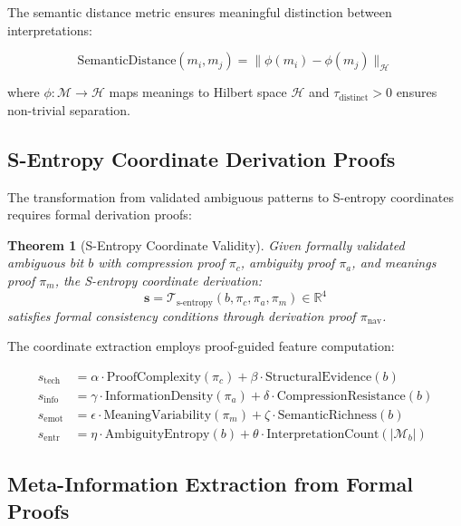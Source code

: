 \documentclass[11pt,a4paper]{article}
\newtheorem{theorem}{Theorem}[section]
\begin{document}
The semantic distance metric ensures meaningful distinction between interpretations:

\begin{equation}
\text{SemanticDistance}(m_i, m_j) = \|\phi(m_i) - \phi(m_j)\|_{\mathcal{H}}
\label{eq:semantic-distance}
\end{equation}

where $\phi: \mathcal{M} \to \mathcal{H}$ maps meanings to Hilbert space $\mathcal{H}$ and $\tau_{\text{distinct}} > 0$ ensures non-trivial separation.

\subsection{S-Entropy Coordinate Derivation Proofs}

The transformation from validated ambiguous patterns to S-entropy coordinates requires formal derivation proofs:

\begin{theorem}[S-Entropy Coordinate Validity]
Given formally validated ambiguous bit $b$ with compression proof $\pi_c$, ambiguity proof $\pi_a$, and meanings proof $\pi_m$, the S-entropy coordinate derivation:
\begin{equation}
\mathbf{s} = \mathcal{T}_{\text{s-entropy}}(b, \pi_c, \pi_a, \pi_m) \in \mathbb{R}^4
\label{eq:s-entropy-derivation}
\end{equation}
satisfies formal consistency conditions through derivation proof $\pi_{\text{nav}}$.
\end{theorem}

The coordinate extraction employs proof-guided feature computation:

\begin{align}
s_{\text{tech}} &= \alpha \cdot \text{ProofComplexity}(\pi_c) + \beta \cdot \text{StructuralEvidence}(b) \label{eq:tech-coordinate}\\
s_{\text{info}} &= \gamma \cdot \text{InformationDensity}(\pi_a) + \delta \cdot \text{CompressionResistance}(b) \label{eq:info-coordinate}\\
s_{\text{emot}} &= \epsilon \cdot \text{MeaningVariability}(\pi_m) + \zeta \cdot \text{SemanticRichness}(b) \label{eq:emot-coordinate}\\
s_{\text{entr}} &= \eta \cdot \text{AmbiguityEntropy}(b) + \theta \cdot \text{InterpretationCount}(|\mathcal{M}_b|) \label{eq:entr-coordinate}
\end{align}

\subsection{Meta-Information Extraction from Formal Proofs}
\end{document}
